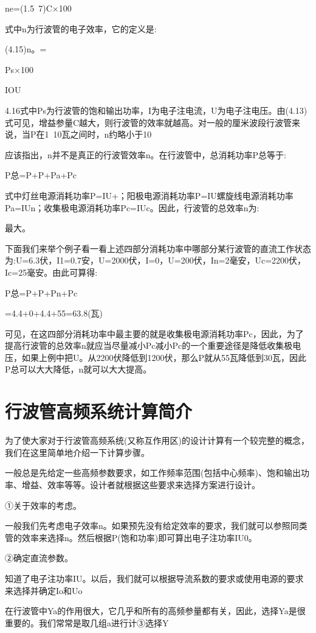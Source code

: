ne=(1.5~7)C×100%


式中n为行波管的电子效率，它的定义是:


(4.15)n。=


Ps×100%


IOU


4.16式中Ps为行波管的饱和输出功率，I为电子注电流，U为电子注电压。由(4.13)式可见，增益参量C越大，则行波管的效率就越高。对一般的厘米波段行波管来说，当P在1~10瓦之间时，n约略小于10%


应该指出，n并不是真正的行波管效率n。在行波管中，总消耗功率P总等于:


P总=P+P+Pa+Pc


式中灯丝电源消耗功率P=IU+；阳极电源消耗功率P=IU螺旋线电源消耗功率Pa=IUn；收集极电源消耗功率Pc=IUc。因此，行波管的总效率n为:



最大。


下面我们来举个例子看一看上述四部分消耗功率中哪部分某行波管的直流工作状态为:U=6.3伏，I1=0.7安，U=2000伏，I=0，U=200伏，In=2毫安，Uc=2200伏，Ic=25毫安。由此可算得:


P总=P+P+Pn+Pc


=4.4+0+4.4+55=63.8(瓦)


可见，在这四部分消耗功率中最主要的就是收集极电源消耗功率Pc，因此，为了提高行波管的总效率n就应当尽量减小Pc减小Pc的一个重要途径是降低收集极电压，如果上例中把U。从2200伏降低到1200伏，那么P就从55瓦降低到30瓦，因此P总可以大大降低，n就可以大大提高。


\section{行波管高频系统计算简介} 
为了使大家对于行波管高频系统(又称互作用区)的设计计算有一个较完整的概念，我们在这里简单地介绍一下计算步骤。


一般总是先给定一些高频参数要求，如工作频率范围(包括中心频率)、饱和输出功率、增益、效率等等。设计者就根据这些要求来选择方案进行设计。


①关于效率的考虑。


一般我们先考虑电子效率n。如果预先没有给定效率的要求，我们就可以参照同类管的效率来选择n。然后根据P(饱和功率)即可算出电子注功率IU0。


②确定直流参数。


知道了电子注功率IU。以后，我们就可以根据导流系数的要求或使用电源的要求来选择并确定Io和Uo


在行波管中Ya的作用很大，它几乎和所有的高频参量都有关，因此，选择Ya是很重要的。我们常常是取几组a进行计③选择Y


